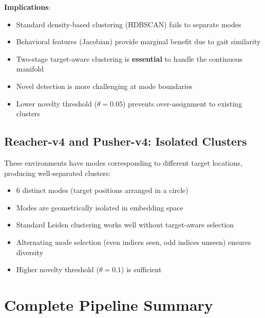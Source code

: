 \documentclass{article}
\begin{document}
\textbf{Implications}:
\begin{itemize}
    \item Standard density-based clustering (HDBSCAN) fails to separate modes
    \item Behavioral features (Jacobian) provide marginal benefit due to gait similarity
    \item Two-stage target-aware clustering is \textbf{essential} to handle the continuous manifold
    \item Novel detection is more challenging at mode boundaries
    \item Lower novelty threshold ($\theta = 0.05$) prevents over-assignment to existing clusters
\end{itemize}

\subsection{Reacher-v4 and Pusher-v4: Isolated Clusters}

These environments have modes corresponding to different target locations, producing well-separated clusters:

\begin{itemize}
    \item 6 distinct modes (target positions arranged in a circle)
    \item Modes are geometrically isolated in embedding space
    \item Standard Leiden clustering works well without target-aware selection
    \item Alternating mode selection (even indices seen, odd indices unseen) ensures diversity
    \item Higher novelty threshold ($\theta = 0.1$) is sufficient
\end{itemize}

\section{Complete Pipeline Summary}
\end{document}
